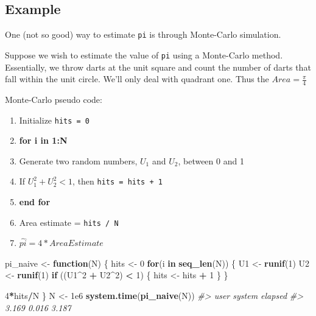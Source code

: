 \documentclass[]{book}
\newenvironment{Shaded}{\begin{snugshade}}{\end{snugshade}}
\newcommand{\CommentTok}[1]{\textcolor[rgb]{0.56,0.35,0.01}{\textit{#1}}}
\newcommand{\ControlFlowTok}[1]{\textcolor[rgb]{0.13,0.29,0.53}{\textbf{#1}}}
\newcommand{\DecValTok}[1]{\textcolor[rgb]{0.00,0.00,0.81}{#1}}
\newcommand{\FloatTok}[1]{\textcolor[rgb]{0.00,0.00,0.81}{#1}}
\newcommand{\KeywordTok}[1]{\textcolor[rgb]{0.13,0.29,0.53}{\textbf{#1}}}
\newcommand{\NormalTok}[1]{#1}
\newcommand{\OperatorTok}[1]{\textcolor[rgb]{0.81,0.36,0.00}{\textbf{#1}}}
\newcommand{\StringTok}[1]{\textcolor[rgb]{0.31,0.60,0.02}{#1}}
\providecommand{\tightlist}{%
  \setlength{\itemsep}{0pt}\setlength{\parskip}{0pt}}
\theoremstyle{definition}
\theoremstyle{definition}
\theoremstyle{definition}
\theoremstyle{remark}
\begin{document}
\hypertarget{example}{%
\subsection{Example}\label{example}}

One (not so good) way to estimate \texttt{pi} is through Monte-Carlo
simulation.

Suppose we wish to estimate the value of \texttt{pi} using a Monte-Carlo
method. Essentially, we throw darts at the unit square and count the
number of darts that fall within the unit circle. We'll only deal with
quadrant one. Thus the \(Area = \frac{\pi}{4}\)

Monte-Carlo pseudo code:

\begin{enumerate}
\def\labelenumi{\arabic{enumi}.}
\tightlist
\item
  Initialize \texttt{hits\ =\ 0}
\item
  \textbf{for i in 1:N}
\item
  Generate two random numbers, \(U_1\) and \(U_2\), between 0 and 1
\item
  If \(U_1^2 + U_2^2 < 1\), then \texttt{hits\ =\ hits\ +\ 1}
\item
  \textbf{end for}
\item
  Area estimate = \texttt{hits\ /\ N}
\item
  \(\hat{pi} = 4 * Area Estimate\)
\end{enumerate}

\begin{Shaded}
\begin{Highlighting}[]
\NormalTok{pi_naive <-}\StringTok{ }\ControlFlowTok{function}\NormalTok{(N) \{}
\NormalTok{  hits <-}\StringTok{ }\DecValTok{0}
  \ControlFlowTok{for}\NormalTok{(i }\ControlFlowTok{in} \KeywordTok{seq_len}\NormalTok{(N)) \{}
\NormalTok{    U1 <-}\StringTok{ }\KeywordTok{runif}\NormalTok{(}\DecValTok{1}\NormalTok{)}
\NormalTok{    U2 <-}\StringTok{ }\KeywordTok{runif}\NormalTok{(}\DecValTok{1}\NormalTok{)}
    \ControlFlowTok{if}\NormalTok{ ((U1}\OperatorTok{^}\DecValTok{2} \OperatorTok{+}\StringTok{ }\NormalTok{U2}\OperatorTok{^}\DecValTok{2}\NormalTok{) }\OperatorTok{<}\StringTok{ }\DecValTok{1}\NormalTok{) \{}
\NormalTok{      hits <-}\StringTok{ }\NormalTok{hits }\OperatorTok{+}\StringTok{ }\DecValTok{1}
\NormalTok{    \}}
\NormalTok{  \}}
  
  \DecValTok{4}\OperatorTok{*}\NormalTok{hits}\OperatorTok{/}\NormalTok{N}
\NormalTok{\}}
\NormalTok{N <-}\StringTok{ }\FloatTok{1e6}
\KeywordTok{system.time}\NormalTok{(}\KeywordTok{pi_naive}\NormalTok{(N))}
\CommentTok{#>    user  system elapsed }
\CommentTok{#>   3.169   0.016   3.187}
\end{Highlighting}
\end{Shaded}
\end{document}
